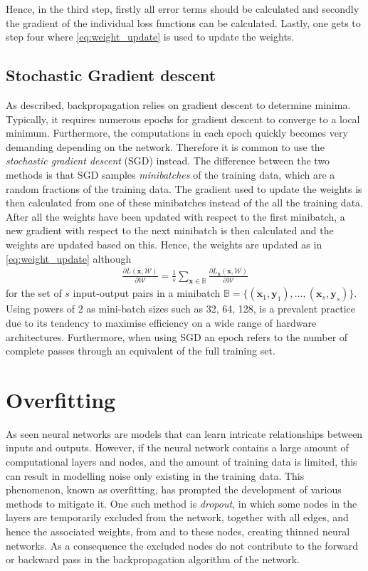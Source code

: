 Hence, in the third step, firstly all error terms should be calculated and secondly the gradient of the individual loss functions can be calculated. Lastly, one gets to step four where \autoref{eq:weight_update} is used to update the weights. 


\subsection{Stochastic Gradient descent}
As described, backpropagation relies on gradient descent to determine minima. Typically, it requires numerous epochs for gradient descent to converge to a local minimum. Furthermore, the computations in each epoch quickly becomes very demanding depending on the network. Therefore it is common to use the \emph{stochastic gradient descent} (SGD) instead. The difference between the two methods is that SGD samples \emph{minibatches} of the training data, which are a random fractions of the training data. The gradient used to update the weights is then calculated from one of these minibatches instead of the all the training data. After all the weights have been updated with respect to the first minibatch, a new gradient with respect to the next minibatch is then calculated and the weights are updated based on this. Hence, the weights are updated as in \eqref{eq:weight_update} although
\begin{align*}
    \frac{\partial L(\bm{x}, \mathcal{W})}{\partial \mathcal{W}} =  \frac{1}{s} \sum_{\bm x \in \mathbb{B}} \frac{\partial L_{\bm{x}}(\bm{x}, \mathcal{W})}{\partial \mathcal{W}}
\end{align*}
for the set of $s$ input-output pairs in a minibatch $\mathbb{B} = \{(\bm{x}_1,\bm{y}_1), \ldots, (\bm{x}_s,\bm{y}_s)\}$. Using powers of 2 as mini-batch sizes such as 32, 64, 128, is a prevalent practice due to its tendency to maximise efficiency on a wide range of hardware architectures. Furthermore, when using SGD an epoch refers to the number of complete passes through an equivalent of the full training set.


\section{Overfitting}
As seen neural networks are models that can learn intricate relationships between inputs and outputs. However, if the neural network contains a large amount of computational layers and nodes, and the amount of training data is limited, this can result in modelling noise only existing in the training data. This phenomenon, known as overfitting, has prompted the development of various methods to mitigate it. One such method is \emph{dropout}, in which some nodes in the layers are temporarily excluded from the network, together with all edges, and hence the associated weights, from and to these nodes, creating thinned neural networks. As a consequence the excluded nodes do not contribute to the forward or backward pass in the backpropagation algorithm of the network. 


